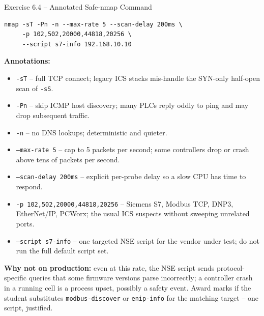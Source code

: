 \documentclass[11pt,a4paper]{article}
\begin{document}
\begin{taskbox}{Exercise 6.4 -- Annotated Safe-nmap Command}
\begin{verbatim}
nmap -sT -Pn -n --max-rate 5 --scan-delay 200ms \
     -p 102,502,20000,44818,20256 \
     --script s7-info 192.168.10.10
\end{verbatim}
\textbf{Annotations:}
\begin{itemize}
  \item \texttt{-sT} -- full TCP connect; legacy ICS stacks
        mis-handle the SYN-only half-open scan of \texttt{-sS}.
  \item \texttt{-Pn} -- skip ICMP host discovery; many PLCs reply
        oddly to ping and may drop subsequent traffic.
  \item \texttt{-n} -- no DNS lookups; deterministic and quieter.
  \item \texttt{--max-rate 5} -- cap to 5 packets per second; some
        controllers drop or crash above tens of packets per second.
  \item \texttt{--scan-delay 200ms} -- explicit per-probe delay so a
        slow CPU has time to respond.
  \item \texttt{-p 102,502,20000,44818,20256} -- Siemens S7, Modbus
        TCP, DNP3, EtherNet/IP, PCWorx; the usual ICS suspects
        without sweeping unrelated ports.
  \item \texttt{--script s7-info} -- one targeted NSE script for the
        vendor under test; do not run the full default script set.
\end{itemize}
\textbf{Why not on production:} even at this rate, the NSE script
sends protocol-specific queries that some firmware versions parse
incorrectly; a controller crash in a running cell is a process upset,
possibly a safety event. Award marks if the student substitutes
\texttt{modbus-discover} or \texttt{enip-info} for the matching
target -- one script, justified.
\end{taskbox}
\end{document}
